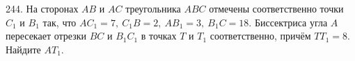 244. На сторонах $AB$ и $AC$ треугольника $ABC$ отмечены соответственно точки $C_1$ и $B_1$ так, что $AC_1=7,\
C_1B=2,\ AB_1=3,\ B_1C=18.$ Биссектриса угла $A$ пересекает отрезки $BC$ и $B_1C_1$ в точках $T$ и $T_1$ соответственно, причём
$TT_1=8.$ Найдите $AT_1.$\\
